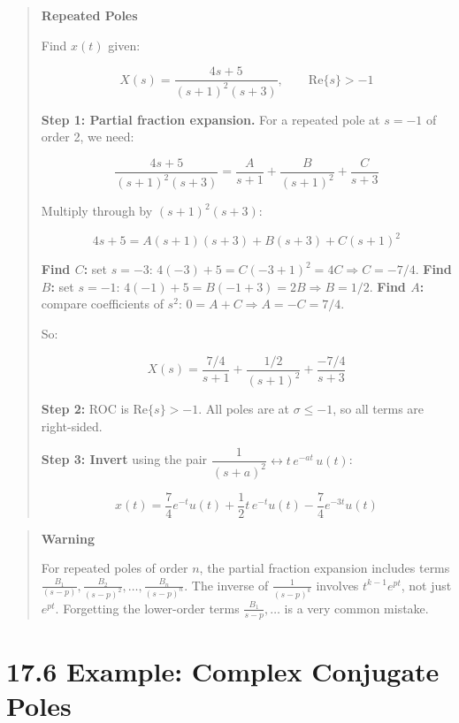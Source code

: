 \documentclass[11pt]{article}
\begin{document}
\begin{quote}
\textbf{Repeated Poles}

Find $x(t)$ given:

\[X(s) = \frac{4s+5}{(s+1)^2 (s+3)}, \qquad \text{Re}\{s\} > -1\]

\textbf{Step 1: Partial fraction expansion.}
For a repeated pole at $s = -1$ of order 2, we need:

\[\frac{4s+5}{(s+1)^2(s+3)} = \frac{A}{s+1} + \frac{B}{(s+1)^2} + \frac{C}{s+3}\]

Multiply through by $(s+1)^2 (s+3)$:

\[4s+5 = A(s+1)(s+3) + B(s+3) + C(s+1)^2\]

\textbf{Find $C$:} set $s = -3$: $4(-3)+5 = C(-3+1)^2 = 4C \Rightarrow C = -7/4$.
\textbf{Find $B$:} set $s = -1$: $4(-1)+5 = B(-1+3) = 2B \Rightarrow B = 1/2$.
\textbf{Find $A$:} compare coefficients of $s^2$: $0 = A + C \Rightarrow A = -C = 7/4$.

So:

\[X(s) = \frac{7/4}{s+1} + \frac{1/2}{(s+1)^2} + \frac{-7/4}{s+3}\]

\textbf{Step 2:} ROC is $\text{Re}\{s\} > -1$. All poles are at $\sigma \le -1$, so all terms are right-sided.

\textbf{Step 3: Invert} using the pair $\dfrac{1}{(s+a)^2} \leftrightarrow t\, e^{-at}\, u(t)$:

\[\boxed{x(t) = \frac{7}{4} e^{-t} u(t) + \frac{1}{2} t\, e^{-t} u(t) - \frac{7}{4} e^{-3t} u(t)}\]
\end{quote}

\begin{quote}
\textbf{Warning}

For repeated poles of order $n$, the partial fraction expansion includes terms $\frac{B_1}{(s-p)}, \frac{B_2}{(s-p)^2}, \ldots, \frac{B_n}{(s-p)^n}$. The inverse of $\frac{1}{(s-p)^k}$ involves $t^{k-1} e^{pt}$, not just $e^{pt}$. Forgetting the lower-order terms $\frac{B_1}{s-p}, \ldots$ is a very common mistake.
\end{quote}

\section*{17.6 Example: Complex Conjugate Poles}
\end{document}
